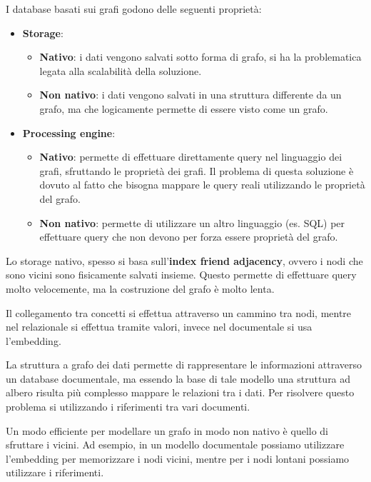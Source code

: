 I database basati sui grafi godono delle seguenti proprietà:
\begin{itemize}
      \item \textbf{Storage}:
            \begin{itemize}
                  \item \textbf{Nativo}: i dati vengono salvati sotto forma di
                        grafo, si ha la problematica legata alla scalabilità 
                        della soluzione.
                  \item \textbf{Non nativo}: i dati vengono salvati in una struttura 
                        differente da un grafo, ma che logicamente permette di essere
                        visto come un grafo.
            \end{itemize}
      \item \textbf{Processing engine}:
            \begin{itemize}
                  \item \textbf{Nativo}: permette di effettuare direttamente query
                        nel linguaggio dei grafi, sfruttando le proprietà dei 
                        grafi. Il problema di questa soluzione è dovuto al fatto 
                        che bisogna mappare le query reali utilizzando le proprietà 
                        del grafo.
                  \item \textbf{Non nativo}: permette di utilizzare un altro 
                        linguaggio (es. SQL) per effettuare query che non devono 
                        per forza essere proprietà del grafo.
            \end{itemize}
\end{itemize}
Lo storage nativo, spesso si basa sull'\textbf{index friend adjacency}, ovvero 
i nodi che sono vicini sono fisicamente salvati insieme. Questo permette di 
effettuare query molto velocemente, ma la costruzione del grafo è molto lenta.

Il collegamento tra concetti si effettua attraverso un cammino tra nodi, mentre 
nel relazionale si effettua tramite valori, invece nel documentale si usa l'embedding.

La struttura a grafo dei dati permette di rappresentare le informazioni 
attraverso un database documentale, ma essendo la base di tale modello una 
struttura ad albero risulta più complesso mappare le relazioni tra i dati. 
Per risolvere questo problema si utilizzando i riferimenti tra vari documenti.

Un modo efficiente per modellare un grafo in modo non nativo è quello di sfruttare 
i vicini. Ad esempio, in un modello documentale possiamo utilizzare l'embedding
per memorizzare i nodi vicini, mentre per i nodi lontani possiamo utilizzare i
riferimenti.

